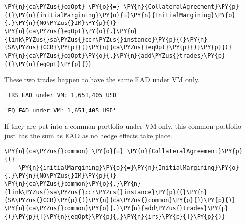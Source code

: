     \begin{tcolorbox}[breakable, size=fbox, boxrule=1pt, pad at break*=1mm,colback=cellbackground, colframe=cellborder]
\begin{Verbatim}[commandchars=\\\{\}]
\PY{n}{ca\PYZus{}eqOpt} \PY{o}{=} \PY{n}{CollateralAgreement}\PY{p}{(}\PY{n}{initialMargining}\PY{o}{=}\PY{n}{InitialMargining}\PY{o}{.}\PY{n}{NO\PYZus{}IM}\PY{p}{)}
\PY{n}{ca\PYZus{}eqOpt}\PY{o}{.}\PY{n}{link\PYZus{}sa\PYZus{}ccr\PYZus{}instance}\PY{p}{(}\PY{n}{SA\PYZus{}CCR}\PY{p}{(}\PY{n}{ca\PYZus{}eqOpt}\PY{p}{)}\PY{p}{)}
\PY{n}{ca\PYZus{}eqOpt}\PY{o}{.}\PY{n}{add\PYZus{}trades}\PY{p}{(}\PY{n}{eqOpt}\PY{p}{)}
\end{Verbatim}
\end{tcolorbox}

    These two trades happen to have the same EAD under VM only.

            \begin{tcolorbox}[breakable, size=fbox, boxrule=.5pt, pad at break*=1mm, opacityfill=0]
\begin{Verbatim}[commandchars=\\\{\}]
'IRS EAD under VM: 1,651,405 USD'
\end{Verbatim}
\end{tcolorbox}
        
            \begin{tcolorbox}[breakable, size=fbox, boxrule=.5pt, pad at break*=1mm, opacityfill=0]
\begin{Verbatim}[commandchars=\\\{\}]
'EQ EAD under VM: 1,651,405 USD'
\end{Verbatim}
\end{tcolorbox}
        
    If they are put into a common portfolio under VM only, this common
portfolio just has the sum as EAD as no hedge effects take place.

    \begin{tcolorbox}[breakable, size=fbox, boxrule=1pt, pad at break*=1mm,colback=cellbackground, colframe=cellborder]
\begin{Verbatim}[commandchars=\\\{\}]
\PY{n}{ca\PYZus{}common} \PY{o}{=} \PY{n}{CollateralAgreement}\PY{p}{(}
    \PY{n}{initialMargining}\PY{o}{=}\PY{n}{InitialMargining}\PY{o}{.}\PY{n}{NO\PYZus{}IM}\PY{p}{)}
\PY{n}{ca\PYZus{}common}\PY{o}{.}\PY{n}{link\PYZus{}sa\PYZus{}ccr\PYZus{}instance}\PY{p}{(}\PY{n}{SA\PYZus{}CCR}\PY{p}{(}\PY{n}{ca\PYZus{}common}\PY{p}{)}\PY{p}{)}
\PY{n}{ca\PYZus{}common}\PY{o}{.}\PY{n}{add\PYZus{}trades}\PY{p}{(}\PY{p}{[}\PY{n}{eqOpt}\PY{p}{,}\PY{n}{irs}\PY{p}{]}\PY{p}{)}
\end{Verbatim}
\end{tcolorbox}

